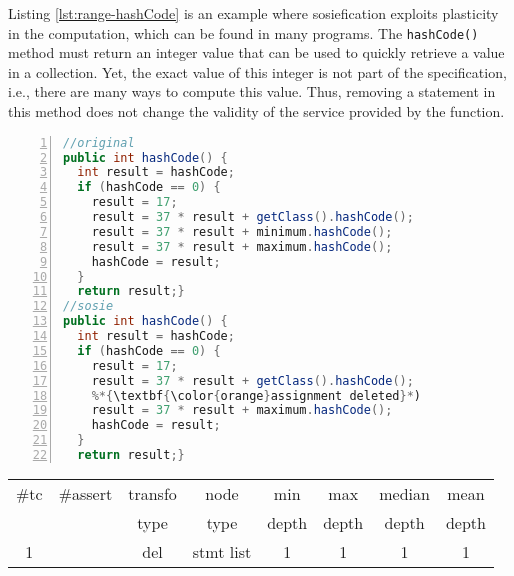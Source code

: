 Listing \ref{lst:range-hashCode} is an example where sosiefication exploits plasticity in the computation, which can be found in many programs. 
The \texttt{hashCode()} method must return an integer value that can be used to quickly retrieve a value in a collection. Yet, the exact value of this integer is not part of the specification, i.e., there are many ways to compute this value. 
Thus, removing a statement in this method does not change the validity of the service provided by the function. 

\begin{minipage}{\columnwidth}
\begin{lstlisting}[caption={\texttt{hashCode} in commons.lang and a sosie},label={lst:range-hashCode},language=java,numbers=left]
//original
public int hashCode() {
  int result = hashCode;
  if (hashCode == 0) {
    result = 17;
    result = 37 * result + getClass().hashCode();
    result = 37 * result + minimum.hashCode();
    result = 37 * result + maximum.hashCode();
    hashCode = result;
  }
  return result;}
//sosie
public int hashCode() {
  int result = hashCode;
  if (hashCode == 0) {
    result = 17;
    result = 37 * result + getClass().hashCode();
    %*{\textbf{\color{orange}assignment deleted}*)
    result = 37 * result + maximum.hashCode();
    hashCode = result;
  }
  return result;}
\end{lstlisting}
\tabcolsep=0.11cm
\begin{tabular}{>{\small}c>{\small}c>{\small}c>{\small}c>{\small}c>{\small}c>{\small}c>{\small}c}
\hline
\rowcolor{lightgray} \#tc & \#assert & transfo & node & min & max & median & mean   \\
\rowcolor{lightgray}  & & type & type & depth  & depth & depth & depth  \\ 
\hline
1&  & del & stmt list &1  &1  &1  &1 \\
\hline
\end{tabular}
\end{minipage}